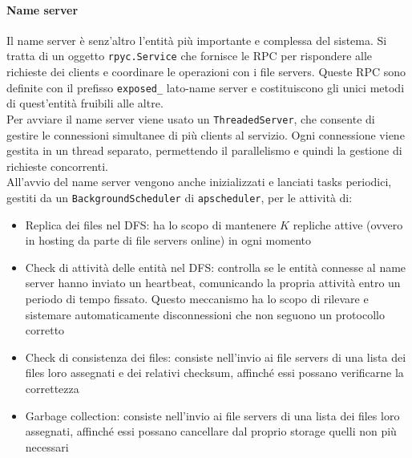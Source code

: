\documentclass[a4paper, 12pt]{scrreprt}
\begin{document}
        \paragraph{Name server}

            Il name server è senz'altro l'entità più importante e complessa del sistema. Si tratta di un oggetto \texttt{rpyc.Service} che fornisce le RPC per rispondere alle richieste dei clients e coordinare le operazioni con i file servers. Queste RPC sono definite con il prefisso \texttt{exposed\_} lato-name server e costituiscono gli unici metodi di quest'entità fruibili alle altre.\\
            Per avviare il name server viene usato un \texttt{ThreadedServer}, che consente di gestire le connessioni simultanee di più clients al servizio. Ogni connessione viene gestita in un thread separato, permettendo il parallelismo e quindi la gestione di richieste concorrenti.\\
            All'avvio del name server vengono anche inizializzati e lanciati tasks periodici, gestiti da un \texttt{BackgroundScheduler} di \texttt{apscheduler}, per le attività di:

            \begin{itemize}

                \item Replica dei files nel DFS: ha lo scopo di mantenere $K$ repliche attive (ovvero in hosting da parte di file servers online) in ogni momento

                \item Check di attività delle entità nel DFS: controlla se le entità connesse al name server hanno inviato un heartbeat, comunicando la propria attività entro un periodo di tempo fissato. Questo meccanismo ha lo scopo di rilevare e sistemare automaticamente disconnessioni che non seguono un protocollo corretto

                \item Check di consistenza dei files: consiste nell'invio ai file servers di una lista dei files loro assegnati e dei relativi checksum, affinché essi possano verificarne la correttezza

                \item Garbage collection: consiste nell'invio ai file servers di una lista dei files loro assegnati, affinché essi possano cancellare dal proprio storage quelli non più necessari

            \end{itemize}
\end{document}
